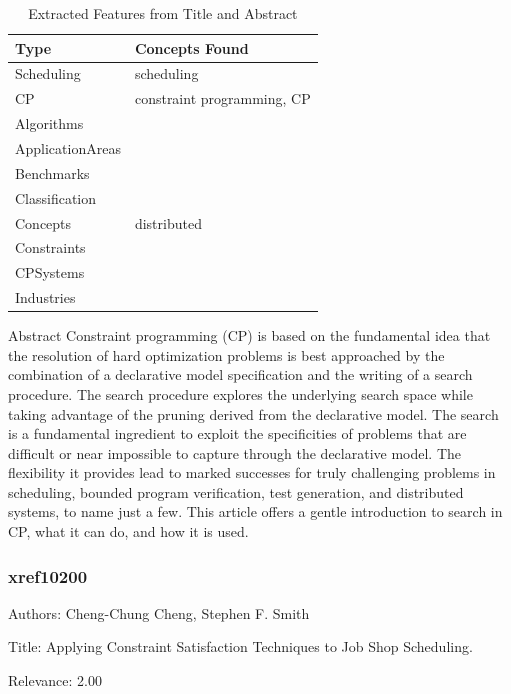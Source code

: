 {\scriptsize
\begin{longtable}{p{2cm}p{20cm}}
\caption{Extracted Features from Title and Abstract}\\ \toprule
Type & Concepts Found\\ \midrule
\endhead
\bottomrule
\endfoot
Scheduling & scheduling\\ 
CP & constraint programming, CP\\ 
Algorithms & \\ 
ApplicationAreas & \\ 
Benchmarks & \\ 
Classification & \\ 
Concepts & distributed\\ 
Constraints & \\ 
CPSystems & \\ 
Industries & \\ 
\end{longtable}
}

 Abstract  Constraint programming (CP) is based on the fundamental idea that the resolution of hard optimization problems is best approached by the combination of a declarative model specification and the writing of a search procedure. The search procedure explores the underlying search space while taking advantage of the pruning derived from the declarative model. The search is a fundamental ingredient to exploit the specificities of problems that are difficult or near impossible to capture through the declarative model. The flexibility it provides lead to marked successes for truly challenging problems in scheduling, bounded program verification, test generation, and distributed systems, to name just a few. This article offers a gentle introduction to search in CP, what it can do, and how it is used. 

\subsubsection{xref10200}
\label{mw:xref10200}

Authors: Cheng-Chung Cheng, Stephen F. Smith

Title: Applying Constraint Satisfaction Techniques to Job Shop Scheduling.

Relevance:  2.00

